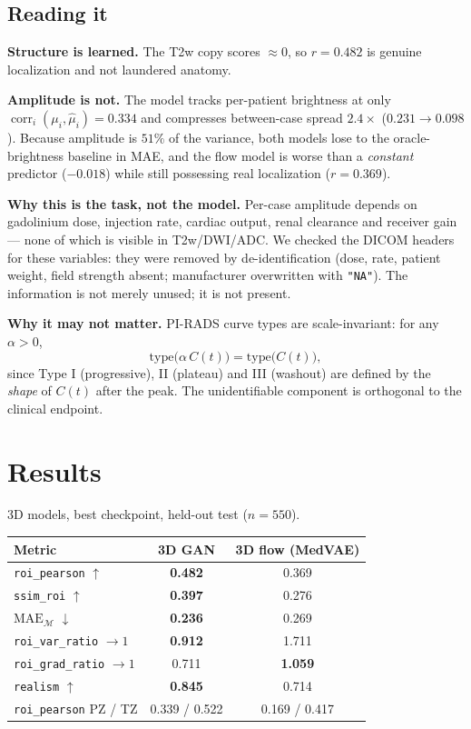 \documentclass[11pt]{article}
\newcommand{\roi}{\mathcal{M}}
\newcommand{\1}{\mathbb{1}}
\begin{document}
\subsection{Reading it}

\textbf{Structure is learned.} The T2w copy scores $\approx0$, so $r=0.482$ is genuine
localization and not laundered anatomy.

\textbf{Amplitude is not.} The model tracks per-patient brightness at only
$\operatorname{corr}_i(\mu_i,\hat\mu_i)=0.334$ and compresses between-case spread
$2.4\times$ ($0.231\to0.098$). Because amplitude is $51\%$ of the variance, both models lose
to the oracle-brightness baseline in MAE, and the flow model is worse than a \emph{constant}
predictor ($-0.018$) while still possessing real localization ($r=0.369$).

\textbf{Why this is the task, not the model.} Per-case amplitude depends on gadolinium dose,
injection rate, cardiac output, renal clearance and receiver gain --- none of which is
visible in T2w/DWI/ADC. We checked the DICOM headers for these variables: they were removed
by de-identification (dose, rate, patient weight, field strength absent; manufacturer
overwritten with \texttt{"NA"}). The information is not merely unused; it is not present.

\textbf{Why it may not matter.} PI-RADS curve types are scale-invariant: for any $\alpha>0$,
\begin{equation}
\text{type}\bigl(\alpha\,C(t)\bigr)=\text{type}\bigl(C(t)\bigr),
\end{equation}
since Type I (progressive), II (plateau) and III (washout) are defined by the \emph{shape}
of $C(t)$ after the peak. The unidentifiable component is orthogonal to the clinical endpoint.

\section{Results}

3D models, best checkpoint, held-out test ($n=550$).

\begin{center}
\begin{tabular}{lcc}
\toprule
Metric & 3D GAN & 3D flow (MedVAE) \\
\midrule
\texttt{roi\_pearson} $\uparrow$ & \textbf{0.482} & 0.369 \\
\texttt{ssim\_roi} $\uparrow$ & \textbf{0.397} & 0.276 \\
$\mathrm{MAE}_{\roi}$ $\downarrow$ & \textbf{0.236} & 0.269 \\
\texttt{roi\_var\_ratio} $\to1$ & \textbf{0.912} & 1.711 \\
\texttt{roi\_grad\_ratio} $\to1$ & 0.711 & \textbf{1.059} \\
\texttt{realism} $\uparrow$ & \textbf{0.845} & 0.714 \\
\texttt{roi\_pearson} PZ / TZ & 0.339 / 0.522 & 0.169 / 0.417 \\
\bottomrule
\end{tabular}
\end{center}
\end{document}
